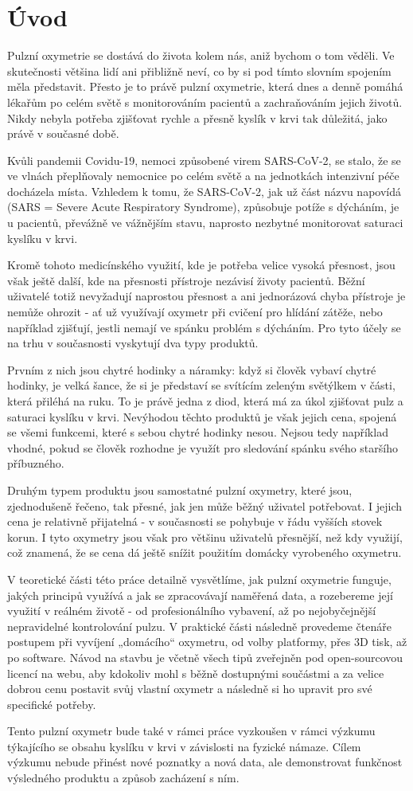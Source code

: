 \newpage
\part{Úvod}
Pulzní oxymetrie se dostává do života kolem nás, aniž bychom o tom věděli. Ve skutečnosti většina lidí ani přibližně neví, co by si pod tímto slovním spojením měla představit. Přesto je to právě pulzní oxymetrie, která dnes a denně pomáhá lékařům po celém světě s monitorováním pacientů a zachraňováním jejich životů. Nikdy nebyla potřeba zjišťovat rychle a přesně kyslík v krvi tak důležitá, jako právě v současné době.
\par Kvůli pandemii Covidu-19, nemoci způsobené virem SARS-CoV-2, se stalo, že se ve vlnách přeplňovaly nemocnice po celém světě a na jednotkách intenzivní péče docházela místa. Vzhledem k tomu, že SARS-CoV-2, jak už část názvu napovídá (SARS = Severe Acute Respiratory Syndrome), způsobuje potíže s dýcháním, je u pacientů, převážně ve vážnějším stavu, naprosto nezbytné monitorovat saturaci kyslíku v krvi.
\par Kromě tohoto medicínského využití, kde je potřeba velice vysoká přesnost, jsou však ještě další, kde na přesnosti přístroje nezávisí životy pacientů. Běžní uživatelé totiž nevyžadují naprostou přesnost a ani jednorázová chyba přístroje je nemůže ohrozit - ať už využívají oxymetr při cvičení pro hlídání zátěže, nebo například zjišťují, jestli nemají ve spánku problém s dýcháním. Pro tyto účely se na trhu v současnosti vyskytují dva typy produktů.
\par Prvním z nich jsou chytré hodinky a náramky: když si člověk vybaví chytré hodinky, je velká šance, že si je představí se svítícím zeleným světýlkem v části, která přiléhá na ruku. To je právě jedna z diod, která má za úkol zjišťovat pulz a saturaci kyslíku v krvi. Nevýhodou těchto produktů je však jejich cena, spojená se všemi funkcemi, které s sebou chytré hodinky nesou. Nejsou tedy například vhodné, pokud se člověk rozhodne je využít pro sledování spánku svého staršího příbuzného.
\par Druhým typem produktu jsou samostatné pulzní oxymetry, které jsou, zjednodušeně řečeno, tak přesné, jak jen může běžný uživatel potřebovat. I jejich cena je relativně přijatelná - v současnosti se pohybuje v řádu vyšších stovek korun. I tyto oxymetry jsou však pro většinu uživatelů přesnější, než kdy využijí, což znamená, že se cena dá ještě snížit použitím domácky vyrobeného oxymetru.
\par V teoretické části této práce detailně vysvětlíme, jak pulzní oxymetrie funguje, jakých principů využívá a jak se zpracovávají naměřená data, a rozebereme její využití v reálném životě - od profesionálního vybavení, až po nejobyčejnější nepravidelné kontrolování pulzu. V praktické části následně provedeme čtenáře postupem při vyvíjení „domácího“ oxymetru, od volby platformy, přes 3D tisk, až po software. Návod na stavbu je včetně všech tipů zveřejněn pod open-sourcovou licencí na webu, aby kdokoliv mohl s běžně dostupnými součástmi a za velice dobrou cenu postavit svůj vlastní oxymetr a následně si ho upravit pro své specifické potřeby.
\par Tento pulzní oxymetr bude také v rámci práce vyzkoušen v rámci výzkumu týkajícího se obsahu kyslíku v krvi v závislosti na fyzické námaze. Cílem výzkumu nebude přinést nové poznatky a nová data, ale demonstrovat funkčnost výsledného produktu a způsob zacházení s ním.